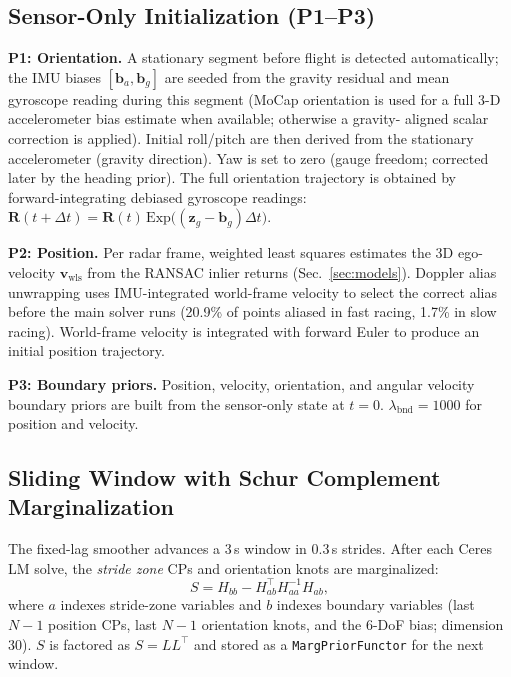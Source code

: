 \documentclass[conference]{IEEEtran}
\newcommand{\vR}{\mathbf{R}}
\newcommand{\vv}{\mathbf{v}}
\newcommand{\vb}{\mathbf{b}}
\newcommand{\vz}{\mathbf{z}}
\newcommand{\Exp}{\mathrm{Exp}}
\begin{document}
\subsection{Sensor-Only Initialization (P1--P3)}
\label{sec:init}

\textbf{P1: Orientation.}
A stationary segment before flight is detected automatically; the IMU
biases $[\vb_a, \vb_g]$ are seeded from the gravity residual and mean
gyroscope reading during this segment (MoCap orientation is used for a
full 3-D accelerometer bias estimate when available; otherwise a gravity-
aligned scalar correction is applied).
Initial roll/pitch are then derived from the stationary accelerometer
(gravity direction).  Yaw is set to zero (gauge freedom; corrected
later by the heading prior).  The full orientation trajectory is
obtained by forward-integrating debiased gyroscope readings:
$\vR(t+\Delta t) = \vR(t)\,\Exp\!\bigl((\vz_g - \vb_g)\Delta t\bigr)$.

\textbf{P2: Position.}
Per radar frame, weighted least squares estimates the 3D ego-velocity
$\vv_{\text{wls}}$ from the RANSAC inlier returns
(Sec.~\ref{sec:models}).  Doppler alias
unwrapping uses IMU-integrated world-frame velocity to select the
correct alias before the main solver runs (20.9\% of points aliased
in fast racing, 1.7\% in slow racing).
World-frame velocity is integrated with forward Euler to produce an
initial position trajectory.

\textbf{P3: Boundary priors.}
Position, velocity, orientation, and angular velocity boundary
priors are built from the sensor-only state at $t=0$.
$\lambda_{\text{bnd}} = 1000$ for position and velocity.

\subsection{Sliding Window with Schur Complement Marginalization}
\label{sec:sw}

The fixed-lag smoother advances a 3\,s window in 0.3\,s strides.
After each Ceres LM solve, the \emph{stride zone} CPs and orientation
knots are marginalized:
\begin{equation}
  S = H_{bb} - H_{ab}^{\top} H_{aa}^{-1} H_{ab},
  \label{eq:schur}
\end{equation}
where $a$ indexes stride-zone variables and $b$ indexes boundary
variables (last $N{-}1$ position CPs, last $N{-}1$ orientation
knots, and the 6-DoF bias; dimension 30).  $S$ is factored as
$S = LL^{\top}$ and stored as a \texttt{MargPriorFunctor} for the
next window.
\end{document}
